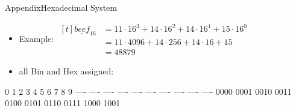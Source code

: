 \begin{frame}{Appendix}{Hexadecimal System}
  \begin{itemize}
    \item \alert{Example:} $\begin{aligned}[t]
        \underline{beef}_{16} &= 11 \cdot 16^3 + 14 \cdot 16^2 + 14 \cdot 16^1 + 15 \cdot 16^0 \\
        &= 11 \cdot 4096 + 14 \cdot 256 + 14 \cdot 16 + 15 \\
        &= 48879
      \end{aligned}$
  \end{itemize}

  \centering
  \begin{itemize}
    \item \alert{all Bin and Hex assigned:}
  \end{itemize}
  \begin{terminal}
  0    1    2    3    4    5    6    7    8    9
  ---- ---- ---- ---- ---- ---- ---- ---- ---- ----
  0000 0001 0010 0011 0100 0101 0110 0111 1000 1001


\end{terminal}
\end{frame}
